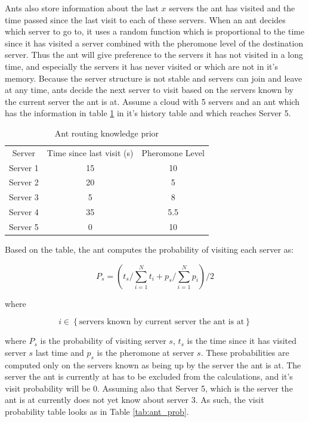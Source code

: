 \documentclass[conference]{IEEEtran}
\begin{document}
Ants also store information about the last $x$ servers the ant has visited and the time passed since the last visit to each of these servers. When an ant decides which server to go to, it uses a random function which is proportional to the time since it has visited a server combined with the pheromone level of the destination server. Thus the ant will give preference to the servers it has not visited in a long time, and especially the servers it has never visited or which are not in it's memory. Because the server structure is not stable and servers can join and leave at any time, ants decide the next server to visit based on the servers known by the current server the ant is at.  Assume a cloud with 5 servers and an ant which has the information in table \ref{tab:ant_prio} in it's history table and which reaches Server 5.

\begin{table}
\centering
\begin{tabular}{c|c|c}
Server & Time since last visit (s) & Pheromone Level \\
Server 1 & 15 & 10 \\ 
Server 2 & 20 & 5 \\
Server 3 & 5 & 8 \\
Server 4 & 35 & 5.5 \\
Server 5 & 0 & 10 \\
\end{tabular}
\caption{Ant routing knowledge prior}
\label{tab:ant_prio}
\end{table}

Based on the table, the ant computes the probability of visiting each server as:

\begin{equation}
P_s = (t_s / \sum_{i=1}^{N} t_i + p_{s} / \sum_{i=1}^{N} p_i) / 2
\end{equation}

where

\begin{equation}
i \in \left\{\text{servers known by current server the ant is at} \right\}
\end{equation}

where $P_s$ is the probability of visiting server $s$, $t_s$ is the time since it has visited server $s$ last time and $p_{s}$ is the pheromone at server $s$. These probabilities are computed only on the servers known as being up by the server the ant is at. The server the ant is currently at has to be excluded from the calculations, and it's visit probability will be 0. Assuming also that Server 5, which is the server the ant is at currently does not yet know about server 3. As such, the visit probability table looks as in Table \ref{tab:ant_prob}.
\end{document}

